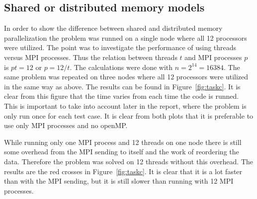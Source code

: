 \subsection{Shared or distributed memory models}
In order to show the difference between shared and distributed memory parallelization the problem was runned on a single node where all 12 processors were utilized. The point was to investigate the performance of using threads versus MPI processes. Thus the relation between threads $t$ and MPI processes $p$ is $p t = 12$ or $p = 12/t$. The calculations were done with $n = 2^{14} = 16384$. 
The same problem was repeated on three nodes where all 12 processors were utilized in the same way as above. The results can be found in Figure~\ref{fig:taskc}. It is clear from this figure that the time varies from each time the code is runned. This is important to take into account later in the report, where the problem is only run once for each test case. It is clear from both plots that it is preferable to use only MPI processes and no openMP. 

While running only one MPI process and 12 threads on one node there is still some overhead from the MPI sending to itself and the work of reordering the data. Therefore the problem was solved on 12 threads without this overhead. The results are the red crosses in Figure~\ref{fig:taskc}. It is clear that it is a lot faster than with the MPI sending, but it is still slower than running with 12 MPI processes. 

